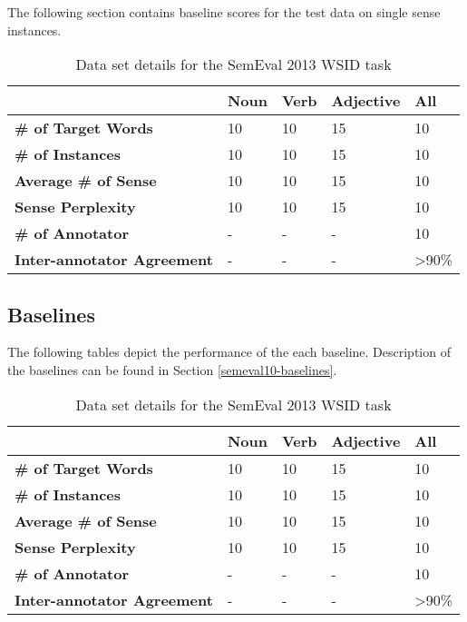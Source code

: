 The following section contains baseline scores for the test data on single sense instances.

\begin{table}
\begin{center}
    \begin{tabular}{ | l | l | l | l | l |}
    \hline  & \bf Noun & \bf Verb & \bf Adjective & \bf All \\ \hline
    \bf \# of Target Words & 10 & 10 & 15 & 10 \\ \hline
    \bf \# of Instances & 10 & 10 & 15 & 10 \\ \hline
    \bf Average \# of Sense & 10 & 10 & 15 & 10 \\ \hline
    \bf Sense Perplexity & 10 & 10 & 15 & 10 \\ \hline
    \bf \# of Annotator & - & - & - & 10 \\ \hline
    \bf Inter-annotator Agreement & - & - & - & \textgreater90\% \\ \hline
    \end{tabular}
\end{center}
    \caption{\label{table:semeval13-dataset} Data set details for the SemEval 2013 WSID task}
\end{table}


\subsection{Baselines}

The following tables depict the performance of the each baseline. Description of the baselines can be found in Section \ref{semeval10-baselines}.


\begin{table}
\begin{center}
    \begin{tabular}{ | l | l | l | l | l |}
    \hline  & \bf Noun & \bf Verb & \bf Adjective & \bf All \\ \hline
    \bf \# of Target Words & 10 & 10 & 15 & 10 \\ \hline
    \bf \# of Instances & 10 & 10 & 15 & 10 \\ \hline
    \bf Average \# of Sense & 10 & 10 & 15 & 10 \\ \hline
    \bf Sense Perplexity & 10 & 10 & 15 & 10 \\ \hline
    \bf \# of Annotator & - & - & - & 10 \\ \hline
    \bf Inter-annotator Agreement & - & - & - & \textgreater90\% \\ \hline
    \end{tabular}
\end{center}
    \caption{\label{table:semeval13-baselines}Data set details for the SemEval 2013 WSID task}
\end{table}


